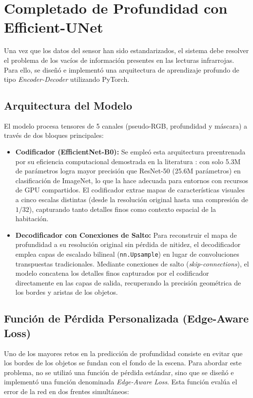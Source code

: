 \documentclass[12pt, a4, twoside, openany]{report}
\begin{document}
\section{Completado de Profundidad con Efficient-UNet}

Una vez que los datos del sensor han sido estandarizados, el sistema debe resolver el problema de los vacíos de información presentes en las lecturas infrarrojas. Para ello, se diseñó e implementó una arquitectura de aprendizaje profundo de tipo \textit{Encoder-Decoder} utilizando PyTorch.

\subsection{Arquitectura del Modelo}

El modelo procesa tensores de 5 canales (pseudo-RGB, profundidad y máscara) a través de dos bloques principales:

\begin{itemize}
    \item \textbf{Codificador (EfficientNet-B0):} Se empleó esta arquitectura preentrenada por su eficiencia computacional demostrada en la literatura \cite{tan2019efficientnet}: con solo 5.3M de parámetros logra mayor precisión que ResNet-50 (25.6M parámetros) en clasificación de ImageNet, lo que la hace adecuada para entornos con recursos de GPU compartidos. El codificador extrae mapas de características visuales a cinco escalas distintas (desde la resolución original hasta una compresión de $1/32$), capturando tanto detalles finos como contexto espacial de la habitación.
    \item \textbf{Decodificador con Conexiones de Salto:} Para reconstruir el mapa de profundidad a su resolución original sin pérdida de nitidez, el decodificador emplea capas de escalado bilineal (\texttt{nn.Upsample}) en lugar de convoluciones transpuestas tradicionales. Mediante conexiones de salto (\textit{skip-connections}), el modelo concatena los detalles finos capturados por el codificador directamente en las capas de salida, recuperando la precisión geométrica de los bordes y aristas de los objetos.
\end{itemize}

\subsection{Función de Pérdida Personalizada (Edge-Aware Loss)}

Uno de los mayores retos en la predicción de profundidad consiste en evitar que los bordes de los objetos se fundan con el fondo de la escena. Para abordar este problema, no se utilizó una función de pérdida estándar, sino que se diseñó e implementó una función denominada \textit{Edge-Aware Loss}. Esta función evalúa el error de la red en dos frentes simultáneos:
\end{document}
